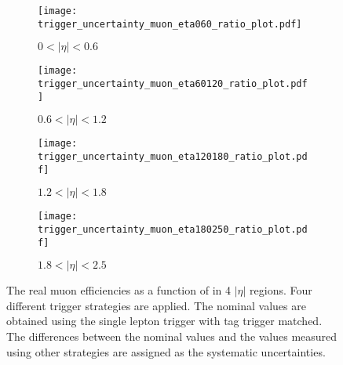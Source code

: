 \begin{figure}[htbp]
    \begin{subfigure}[b]{0.48\textwidth}
        \begin{center}
            \texttt{[image: trigger\_uncertainty\_muon\_eta060\_ratio\_plot.pdf]}
            \caption{$0 < |\eta| < 0.6$}
        \end{center}
    \end{subfigure}
    \begin{subfigure}[b]{0.48\textwidth}
        \begin{center}
            \texttt{[image: trigger\_uncertainty\_muon\_eta60120\_ratio\_plot.pdf]}
            \caption{$0.6 < |\eta| < 1.2$}
        \end{center}
    \end{subfigure}
    \begin{subfigure}[b]{0.48\textwidth}
        \begin{center}
            \texttt{[image: trigger\_uncertainty\_muon\_eta120180\_ratio\_plot.pdf]}
            \caption{$1.2 < |\eta| < 1.8$}
        \end{center}
    \end{subfigure}
    \begin{subfigure}[b]{0.48\textwidth}
        \begin{center}
            \texttt{[image: trigger\_uncertainty\_muon\_eta180250\_ratio\_plot.pdf]}
            \caption{$1.8 < |\eta| < 2.5$}
        \end{center}
    \end{subfigure}
    \caption{The real muon efficiencies as a function of \pt in 4 $|\eta|$ regions.
    Four different trigger strategies are applied.
    The nominal values are obtained using the single lepton trigger with tag trigger matched.
    The differences between the nominal values and the values measured using other strategies are assigned as the systematic uncertainties.}
    \label{fig:app_RLE_trigger_bias_muon}
\end{figure}

